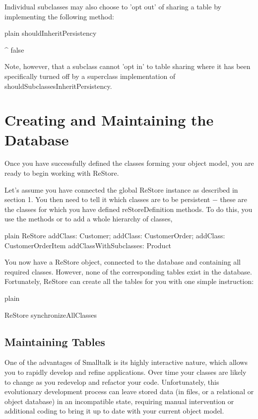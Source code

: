 \documentclass[10pt,twoside,english]{_support/latex/sbabook/sbabook}
\begin{document}
Individual subclasses may also choose to 'opt out' of sharing a table by implementing the following method: 

\begin{displaycode}{plain}
shouldInheritPersistency 

	^ false
\end{displaycode}

Note, however, that a subclass cannot 'opt in' to table sharing where it has been specifically turned off by a superclass implementation of shouldSubclassesInheritPersistency.
 
\section{Creating and Maintaining the Database}
Once you have successfully defined the classes forming your object model, you are ready to begin working with ReStore. 

Let’s assume you have connected the global ReStore instance as described in section 1. You then need to tell it which classes are to be persistent − these are the classes for which you have defined reStoreDefinition methods. To do this, you use the methods  or to add a whole hierarchy of classes, 

\begin{displaycode}{plain}
ReStore
	addClass: Customer;
	addClass: CustomerOrder;
	addClass: CustomerOrderItem
	addClassWithSubclasses: Product
\end{displaycode}

You now have a ReStore object, connected to the database and containing all required classes. However, none of the corresponding tables exist in the database. Fortunately, ReStore can create all the tables for you with one simple instruction:

\begin{displaycode}{plain}

	ReStore synchronizeAllClasses
\end{displaycode}
\subsection{Maintaining Tables}
One of the advantages of Smalltalk is its highly interactive nature, which allows you to rapidly develop and refine applications. Over time your classes are likely to change as you redevelop and refactor your code. Unfortunately, this evolutionary development process can leave stored data (in files, or a relational or object database) in an incompatible state, requiring manual intervention or additional coding to bring it up to date with your current object model.
\end{document}
